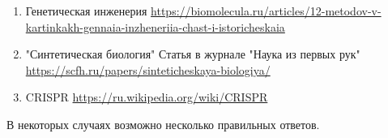 \begin{enumerate}
    \item Генетическая инженерия \url{https://biomolecula.ru/articles/12-metodov-v-kartinkakh-gennaia-inzheneriia-chast-i-istoricheskaia}
    \item "Синтетическая биология" Статья в журнале "Наука из первых рук" \url{https://scfh.ru/papers/sinteticheskaya-biologiya/}
    \item CRISPR \url{https://ru.wikipedia.org/wiki/CRISPR}
\end{enumerate}

\explanationSection

В некоторых случаях возможно несколько правильных ответов.


